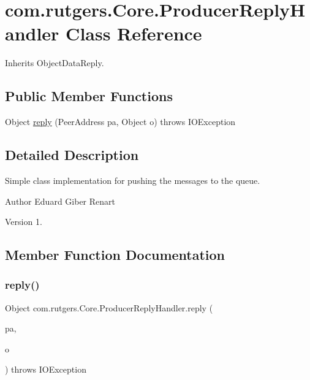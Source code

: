 \hypertarget{classcom_1_1rutgers_1_1Core_1_1ProducerReplyHandler}{}\section{com.\+rutgers.\+Core.\+Producer\+Reply\+Handler Class Reference}
\label{classcom_1_1rutgers_1_1Core_1_1ProducerReplyHandler}


Inherits Object\+Data\+Reply.

\subsection*{Public Member Functions}
\begin{DoxyCompactItemize}
\item 
Object \hyperlink{classcom_1_1rutgers_1_1Core_1_1ProducerReplyHandler_a80187ab3c9d8543cf231e52ee159b815}{reply} (Peer\+Address pa, Object o)  throws I\+O\+Exception 
\end{DoxyCompactItemize}


\subsection{Detailed Description}
Simple class implementation for pushing the messages to the queue.

\begin{DoxyAuthor}{Author}
Eduard Giber Renart 
\end{DoxyAuthor}
\begin{DoxyVersion}{Version}
1. 
\end{DoxyVersion}


\subsection{Member Function Documentation}
\mbox{\label{classcom_1_1rutgers_1_1Core_1_1ProducerReplyHandler_a80187ab3c9d8543cf231e52ee159b815}} 
\subsubsection{\texorpdfstring{reply()}{reply()}}
{\footnotesize\ttfamily Object com.\+rutgers.\+Core.\+Producer\+Reply\+Handler.\+reply (\begin{DoxyParamCaption}\item[{Peer\+Address}]{pa,  }\item[{Object}]{o }\end{DoxyParamCaption}) throws I\+O\+Exception}

